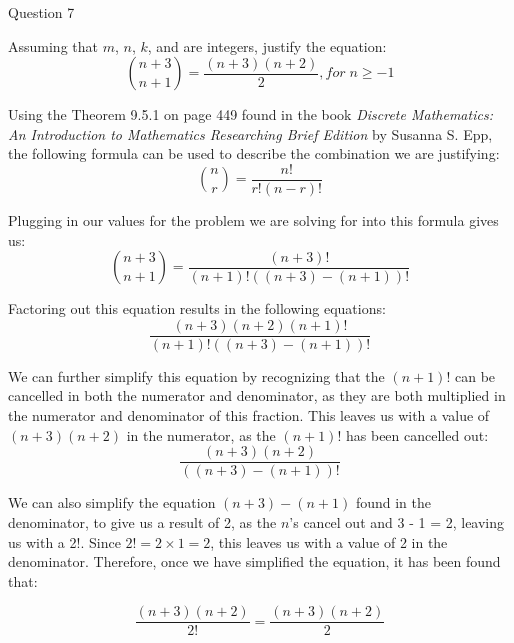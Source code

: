 \documentclass{article}
\begin{document}
\clearpage
{} Question 7
\item[] 
Assuming that $m$, $n$, $k$, and are integers, justify the equation:
$$
\binom{n+3}{n+1} = \frac{(n+3)(n+2)}{2}, for \; n  \geq -1 $$
\item[]Using the Theorem 9.5.1 on page 449 found in the book \textit {Discrete Mathematics: An Introduction to Mathematics Researching Brief Edition} by Susanna S. Epp, the following formula can be used to describe the combination we are justifying: 
$$\binom{n}{r} = \frac{n!}{r!(n - r)!}$$
\item[]Plugging in our values for the problem we are solving for into this formula gives us:
$$\binom{n+3}{n+1} = \frac{(n+3)!}{(n+1)!((n+3)-(n+1))!} $$
\item[]Factoring out this equation results in the following equations:
$$\frac{(n+3)(n+2)(n+1)!}{(n+1)!((n+3)-(n+1))!}$$
\item[]We can further simplify this equation by recognizing that the $(n+1)!$ can be cancelled in both the numerator and denominator, as they are both multiplied in the numerator and denominator of this fraction. This leaves us with a value of $(n+3)(n+2)$ in the numerator, as the $(n+1)!$ has been cancelled out:
$$\frac{{(n+3)}(n+2)}{((n+3)-(n+1))!}$$
\item[]We can also simplify the equation $(n+3) - (n+1)$ found in the denominator, to give us a result of 2, as the $n$'s cancel out and 3 - 1 = 2, leaving us with a 2!. Since $2! = 2 \times 1 = 2$, this leaves us with a value of 2 in the denominator. Therefore, once we have simplified the equation, it has been found that:

$$\frac{(n+3)(n+2)}{2!} = \frac{(n+3)(n+2)}{2}$$
\end{document}
